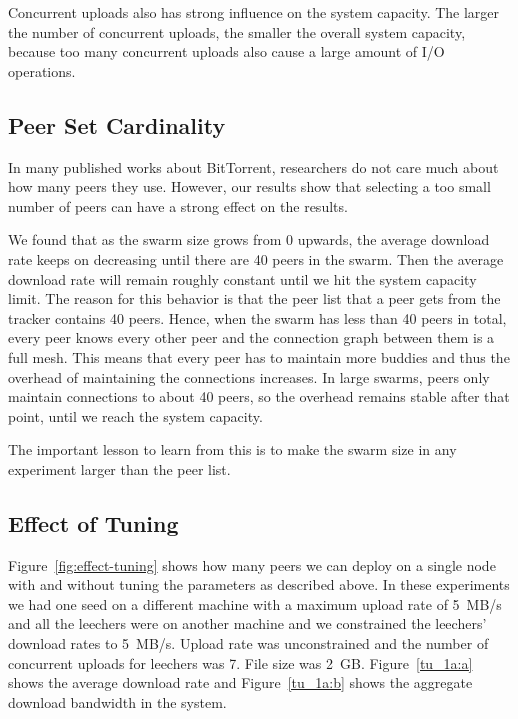 \documentclass[10pt,letterpaper,twocolumn]{article}
\begin{document}
Concurrent uploads also has strong influence on the system capacity.
The larger the number of concurrent uploads, the smaller the overall
system capacity, because too many concurrent uploads also cause a
large amount of I/O operations.

\subsection{Peer Set Cardinality}
\label{sec:peer-set-cardinality}

In many published works about BitTorrent, researchers do not care much
about how many peers they use. However, our results show that
selecting a too small number of peers can have a strong effect on the
results. 



We found that as the swarm size grows from 0 upwards, the average
download rate keeps on decreasing until there are 40 peers in the
swarm. Then the average download rate will remain roughly constant
until we hit the system capacity limit. The reason for this behavior
is that the peer list that a peer gets from the tracker contains 40
peers. Hence, when the swarm has less than 40 peers in total, every
peer knows every other peer and the connection graph between them is a
full mesh. This means that every peer has to maintain more buddies and
thus the overhead of maintaining the connections increases. In large
swarms, peers only maintain connections to about 40 peers, so the
overhead remains stable after that point, until we reach the system
capacity. 



The important lesson to learn from this is to make the swarm size in
any experiment larger than the peer list.





\subsection{Effect of Tuning}
\label{improved_result}

Figure~\ref{fig:effect-tuning} shows how many peers we can deploy on a
single node with and without tuning the parameters as described
above. In these experiments we had one seed on a different machine
with a maximum upload rate of 5~MB/s and all the leechers were on
another machine and we constrained the leechers' download rates to
5~MB/s. Upload rate was unconstrained and the number of concurrent
uploads for leechers was 7. File size was 2~GB. Figure~\ref{tu_1a:a}
shows the average download rate and Figure~\ref{tu_1a:b} shows the
aggregate download bandwidth in the system.
\end{document}
